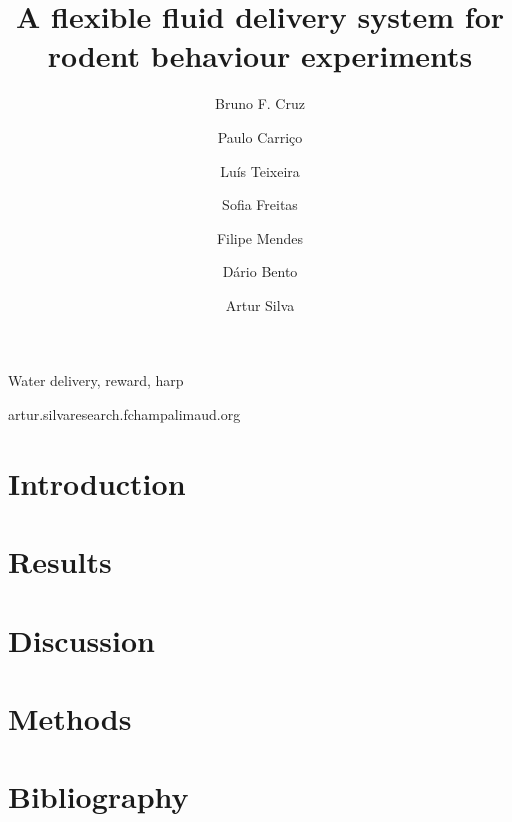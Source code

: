 
\title{A flexible fluid delivery system for rodent behaviour experiments}
\shorttitle{}

\author[1,2,3]{Bruno F. Cruz}
\author[2]{Paulo Carriço}
\author[2]{Luís Teixeira}
\author[2]{Sofia Freitas}
\author[2]{Filipe Mendes}
\author[2]{Dário Bento}
\author[1,\Letter]{Artur Silva}
\date{}

\maketitle

\begin{abstract}


\end{abstract}

\begin{keywords}
Water delivery, reward, harp
\end{keywords}

\begin{corrauthor}
artur.silva\at research.fchampalimaud.org
\end{corrauthor}

\section*{Introduction}\label{s:introduction}


\section*{Results}\label{s:results}


\section*{Discussion}\label{s:discussion}


\section*{Methods}\label{s:methods}


\section*{Bibliography}



